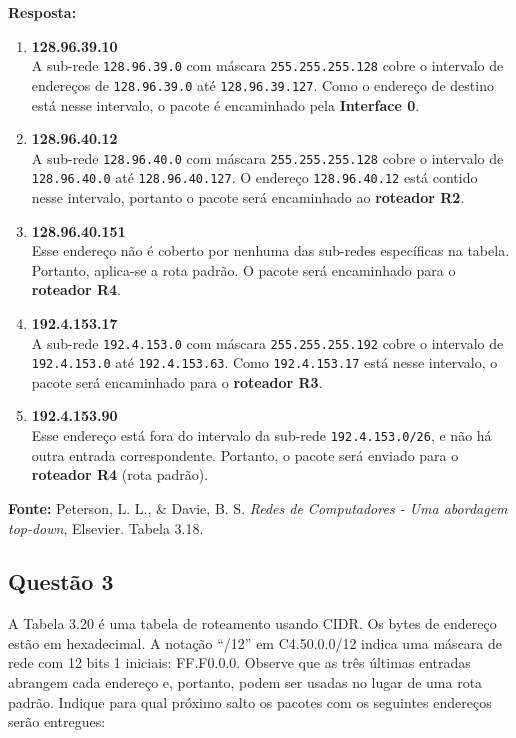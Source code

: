 \textbf{Resposta:}
\begin{enumerate}[label=\textbf{\alph*}.]
    \item \textbf{128.96.39.10} \\
    A sub-rede \texttt{128.96.39.0} com máscara \texttt{255.255.255.128} cobre o intervalo de endereços de \texttt{128.96.39.0} até \texttt{128.96.39.127}. Como o endereço de destino está nesse intervalo, o pacote é encaminhado pela \textbf{Interface 0}.
    
    \item \textbf{128.96.40.12} \\
    A sub-rede \texttt{128.96.40.0} com máscara \texttt{255.255.255.128} cobre o intervalo de \texttt{128.96.40.0} até \texttt{128.96.40.127}. O endereço \texttt{128.96.40.12} está contido nesse intervalo, portanto o pacote será encaminhado ao \textbf{roteador R2}.
    
    \item \textbf{128.96.40.151} \\
    Esse endereço não é coberto por nenhuma das sub-redes específicas na tabela. Portanto, aplica-se a rota padrão. O pacote será encaminhado para o \textbf{roteador R4}.
    
    \item \textbf{192.4.153.17} \\
    A sub-rede \texttt{192.4.153.0} com máscara \texttt{255.255.255.192} cobre o intervalo de \texttt{192.4.153.0} até \texttt{192.4.153.63}. Como \texttt{192.4.153.17} está nesse intervalo, o pacote será encaminhado para o \textbf{roteador R3}.
    
    \item \textbf{192.4.153.90} \\
    Esse endereço está fora do intervalo da sub-rede \texttt{192.4.153.0/26}, e não há outra entrada correspondente. Portanto, o pacote será enviado para o \textbf{roteador R4} (rota padrão).
\end{enumerate}

\textbf{Fonte:} Peterson, L. L., \& Davie, B. S. \textit{Redes de Computadores - Uma abordagem top-down}, Elsevier. Tabela 3.18.

\subsection{Questão 3}
A Tabela 3.20 é uma tabela de roteamento usando CIDR. Os bytes de endereço estão em
hexadecimal. A notação “/12” em C4.50.0.0/12 indica uma máscara de rede com 12 bits 1 iniciais:
FF.F0.0.0. Observe que as três últimas entradas abrangem cada endereço e, portanto, podem ser usadas no lugar de uma rota padrão. 
Indique para qual próximo salto os pacotes com os seguintes endereços serão entregues:

